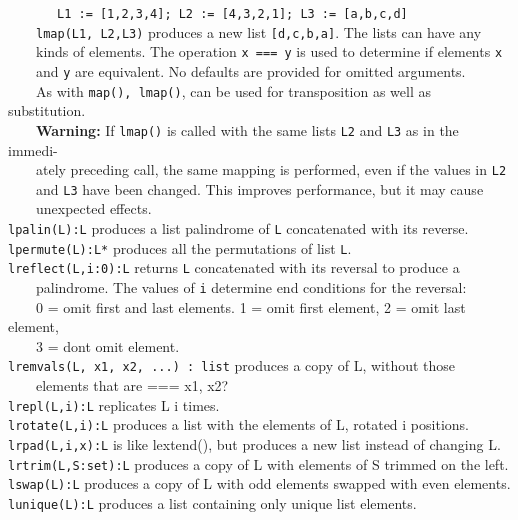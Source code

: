  \ \ \ \ \ \ \ \texttt{L1 := [1,2,3,4]; L2 := [4,3,2,1]; L3 :=
[{\textquotedbl}a{\textquotedbl},{\textquotedbl}b{\textquotedbl},{\textquotedbl}c{\textquotedbl},{\textquotedbl}d{\textquotedbl}]}\\
 \ \ \ \ \texttt{lmap(L1, L2,L3)} produces a new list
\texttt{[{\textquotedbl}d{\textquotedbl},{\textquotedbl}c{\textquotedbl},{\textquotedbl}b{\textquotedbl},{\textquotedbl}a{\textquotedbl}]}.
The lists can have any\\
 \ \ \ \ kinds of elements. The operation \texttt{x === y} is used to
determine if elements \texttt{x}\\
 \ \ \ \ and \texttt{y} are equivalent. No defaults are provided for omitted arguments.\\
 \ \ \ \ As
with \texttt{map(), lmap()}, can be used for transposition as well as substitution.\\
 \ \ \ \ \textbf{Warning: }If \texttt{lmap()} is called with
 the same lists \texttt{L2} and \texttt{L3} as in the
immedi-\\
 \ \ \ \ ately preceding call, the same mapping is performed, even if
 the values in \texttt{L2} \\
 \ \ \ \ and \texttt{L3} have been changed. This improves performance,
 but it may cause \\
 \ \ \ \ unexpected effects. \\
\texttt{lpalin(L):L} produces a list palindrome of \texttt{L}
concatenated with its reverse.\\
\texttt{lpermute(L):L*} produces all the permutations of list
\texttt{L}.\\
\texttt{lreflect(L,i:0):L} returns \texttt{L} concatenated with its
reversal to produce a\\
 \ \ \ \ palindrome. The values of \texttt{i} determine
{\textquotedbl}end conditions{\textquotedbl} for the reversal:\\
 \ \ \ \ 0 = omit first and last elements. 1 = omit first element, 2 =
omit last element,\\
 \ \ \ \ 3 = don{\textquotesingle}t omit element.\\
\texttt{lremvals(L, x1, x2, ...) : list} produces a copy of L, without
those\\
 \ \ \ \ elements that are === x1, x2?\\
\texttt{lrepl(L,i):L} replicates L i
times.\\
\texttt{lrotate(L,i):L} produces a list with the elements of L, rotated i
positions.\\
\texttt{lrpad(L,i,x):L} is like lextend(), but produces a new list instead of
changing L.\\
\texttt{lrtrim(L,S:set):L} produces a copy of L with elements of S trimmed on
 the left.\\
\texttt{lswap(L):L} produces a copy of L with odd elements swapped with even
elements.\\
\texttt{lunique(L):L} produces a list containing only unique list elements.

